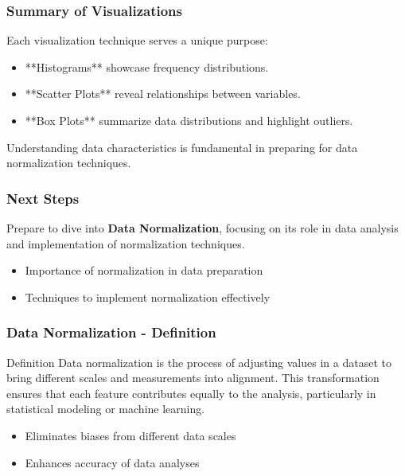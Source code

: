 \documentclass[aspectratio=169]{beamer}
\begin{document}
\begin{frame}[fragile]
    \frametitle{Summary of Visualizations}
    
    Each visualization technique serves a unique purpose:
    \begin{itemize}
        \item **Histograms** showcase frequency distributions.
        \item **Scatter Plots** reveal relationships between variables.
        \item **Box Plots** summarize data distributions and highlight outliers.
    \end{itemize}
    
    Understanding data characteristics is fundamental in preparing for data normalization techniques. 
\end{frame}

\begin{frame}[fragile]
    \frametitle{Next Steps}
    
    Prepare to dive into \textbf{Data Normalization}, focusing on its role in data analysis and implementation of normalization techniques.
    \begin{itemize}
        \item Importance of normalization in data preparation
        \item Techniques to implement normalization effectively
    \end{itemize}
\end{frame}

\begin{frame}[fragile]
    \frametitle{Data Normalization - Definition}
    \begin{block}{Definition}
        Data normalization is the process of adjusting values in a dataset to bring different scales and measurements into alignment. This transformation ensures that each feature contributes equally to the analysis, particularly in statistical modeling or machine learning.
    \end{block}
    \begin{itemize}
        \item Eliminates biases from different data scales
        \item Enhances accuracy of data analyses
    \end{itemize}
\end{frame}
\end{document}
